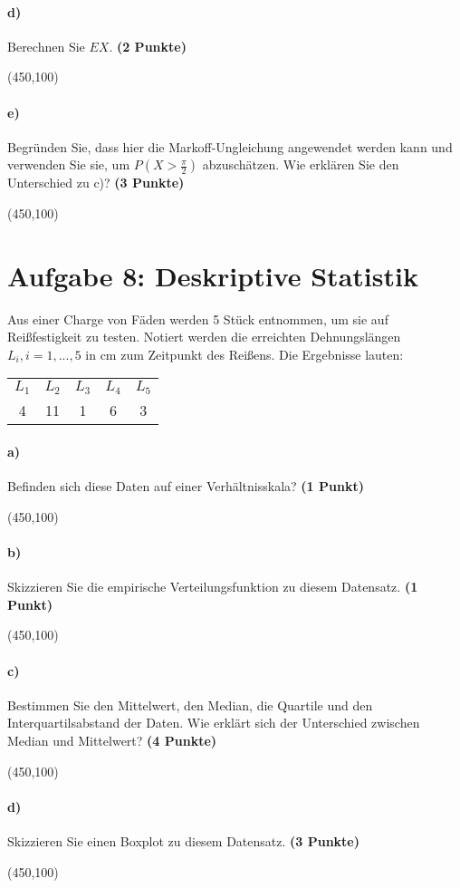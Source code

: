 \documentclass[10pt, a4paper]{article}
\begin{document}
\paragraph{d)} Berechnen Sie $E X$. \textbf{(2 Punkte)}
\begin{center}
  \framebox(450,100){}
\end{center}

\paragraph{e)} Begründen Sie, dass hier die Markoff-Ungleichung angewendet werden kann und verwenden Sie sie, um $P(X >\frac{\pi}{2})$ abzuschätzen. Wie erklären Sie den Unterschied zu c)? \textbf{(3 Punkte)}
\begin{center}
  \framebox(450,100){}
\end{center}

\section{Aufgabe 8: Deskriptive Statistik}
Aus einer Charge von Fäden werden 5 Stück entnommen, um sie auf Reißfestigkeit zu testen. Notiert werden die erreichten Dehnungslängen $L_i,i= 1,...,5$ in cm zum Zeitpunkt des Reißens. Die Ergebnisse lauten:
\begin{tabular}{c | c | c | c | c}
  $L_1$ & $L_2$ & $L_3$ & $L_4$ & $L_5$ \\
  4   & 11  & 1   & 6   & 3
\end{tabular}

\paragraph{a)} Befinden sich diese Daten auf einer Verhältnisskala? \textbf{(1 Punkt)}
\begin{center}
  \framebox(450,100){}
\end{center}

\paragraph{b)} Skizzieren Sie die empirische Verteilungsfunktion zu diesem Datensatz. \textbf{(1 Punkt)}
\begin{center}
  \framebox(450,100){}
\end{center}

\paragraph{c)} Bestimmen Sie den Mittelwert, den Median, die Quartile und den Interquartilsabstand der Daten. Wie erklärt sich der Unterschied zwischen Median und Mittelwert? \textbf{(4 Punkte)}
\begin{center}
  \framebox(450,100){}
\end{center}

\paragraph{d)} Skizzieren Sie einen Boxplot zu diesem Datensatz. \textbf{(3 Punkte)}
\begin{center}
  \framebox(450,100){}
\end{center}
\end{document}
